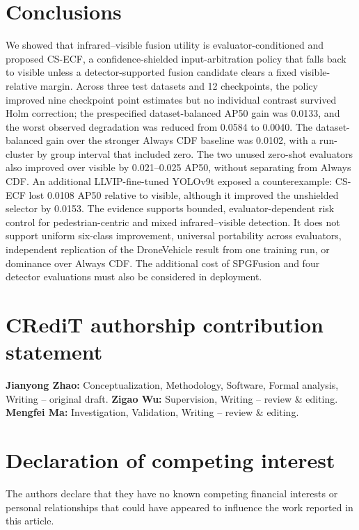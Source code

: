 \documentclass[preprint,11pt]{elsarticle}
\begin{document}
\section{Conclusions}

We showed that infrared--visible fusion utility is evaluator-conditioned and
proposed CS-ECF, a confidence-shielded input-arbitration policy that falls back
to visible unless a detector-supported fusion candidate clears a fixed
visible-relative margin. Across three test datasets and 12 checkpoints, the
policy improved nine checkpoint point estimates but no individual contrast
survived Holm correction; the prespecified dataset-balanced AP50 gain was
0.0133, and the worst observed degradation was reduced from 0.0584 to 0.0040.
The dataset-balanced gain over the stronger Always CDF baseline was 0.0102,
with a run-cluster by group interval that included zero. The
two unused zero-shot evaluators also improved over visible by 0.021--0.025 AP50,
without separating from Always CDF. An additional LLVIP-fine-tuned YOLOv9t
exposed a counterexample: CS-ECF lost 0.0108 AP50 relative to visible, although
it improved the unshielded selector by 0.0153. The evidence supports bounded,
evaluator-dependent risk control for pedestrian-centric and mixed
infrared--visible detection. It does not support uniform six-class improvement,
universal portability across evaluators, independent replication of the
DroneVehicle result from one training run, or dominance over Always CDF. The
additional cost of SPGFusion and four detector evaluations must also be
considered in deployment.

\section*{CRediT authorship contribution statement}

\textbf{Jianyong Zhao:} Conceptualization, Methodology, Software, Formal
analysis, Writing -- original draft. \textbf{Zigao Wu:} Supervision, Writing
-- review \& editing. \textbf{Mengfei Ma:} Investigation, Validation,
Writing -- review \& editing.

\section*{Declaration of competing interest}

The authors declare that they have no known competing financial interests or
personal relationships that could have appeared to influence the work reported
in this article.
\end{document}
